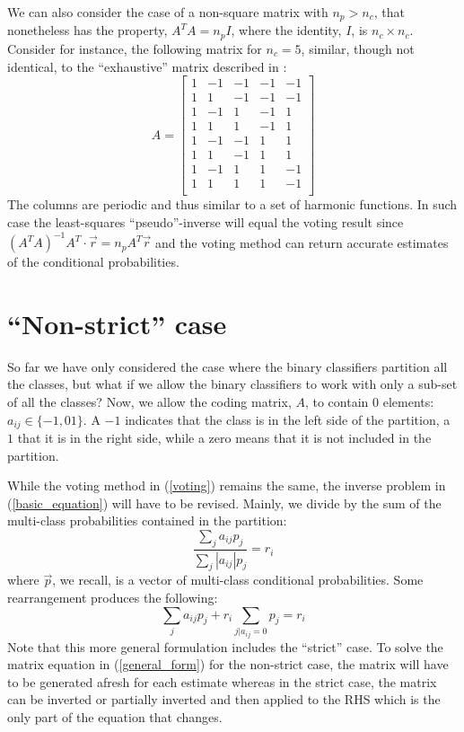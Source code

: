 \documentclass{article}
\begin{document}
We can also consider the case of a non-square matrix with $n_p > n_c$,
that nonetheless has the property, $A^T A = n_p I$, where the
identity, $I$, is $n_c \times n_c$. Consider for instance, 
the following matrix for $n_c=5$, 
similar, though not identical, to the ``exhaustive''
matrix described in \citet{Dietterich_Bakiri1995}:
\begin{equation}
  A = 
  \begin{bmatrix}
    1 & -1 & -1 & -1 & -1 \\
    1 &  1 & -1 & -1 & -1 \\
    1 & -1 &  1 & -1 &  1 \\
    1 &  1 &  1 & -1 &  1 \\
    1 & -1 & -1 &  1 &  1 \\
    1 &  1 & -1 &  1 &  1 \\
    1 & -1 &  1 &  1 & -1 \\
    1 &  1 &  1 &  1 & -1 \\
  \end{bmatrix}
\end{equation}
The columns are periodic and thus similar to a set of harmonic functions.
In such case the least-squares ``pseudo''-inverse will equal the voting result
since $(A^T A)^{-1} A^T \cdot \vec r = n_p A^T \vec r$ and the voting method
can return accurate estimates of the conditional probabilities.

\section{``Non-strict'' case}

\label{non_strict}

So far we have only considered the case where the binary classifiers partition
all the classes, but what if we allow the binary classifiers to work with only
a sub-set of all the classes? Now, we allow the coding matrix, $A$, to 
contain $0$ elements: $a_{ij} \in \lbrace -1, 0 1 \rbrace$. 
A $-1$ indicates that the class is in the left side of
the partition, a $1$ that it is in the right side, while a zero means that
it is not included in the partition. 

While the voting method in (\ref{voting}) remains the 
same, the inverse problem in (\ref{basic_equation}) will have to be revised. 
Mainly, we divide
by the sum of the multi-class probabilities contained in the partition:
\begin{equation}
	\frac{\sum_j a_{ij} p_j}{\sum_j |a_{ij}| p_j} = r_i
\end{equation}
where $\vec p$, we recall, is a vector of multi-class conditional probabilities. 
Some rearrangement produces the following:
\begin{equation}
	\sum_j a_{ij} p_j + r_i \sum_{j|a_{ij}=0} p_j = r_i
	\label{general_form}
\end{equation}
Note that this more general formulation includes the ``strict'' case.
To solve the matrix equation in (\ref{general_form}) for the non-strict case, 
the matrix will have to be generated afresh for each estimate
whereas in the strict case, the matrix can be inverted or partially inverted
and then applied to the RHS which is the only part of the equation that
changes.
\end{document}
